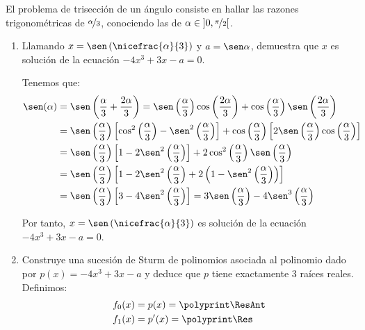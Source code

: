 \begin{ejercicio}
    El problema de trisección de un ángulo consiste en hallar las razones trigonométricas de $\nicefrac{\alpha}{3}$, conociendo las de $\alpha \in \left]0,\nicefrac{\pi}{2}\right[$.
    \begin{enumerate}
        \item Llamando $x = \sen\left(\nicefrac{\alpha}{3}\right)$ y $a = \sen \alpha$, demuestra que $x$ es solución de la ecuación $-4x^3 + 3x - a = 0$.
        
        Tenemos que:
        \begin{align*}
            \sen(\alpha)
            &= \sen\left(\dfrac{\alpha}{3}+\dfrac{2\alpha}{3}\right)=\sen\left(\dfrac{\alpha}{3}\right)\cos\left(\dfrac{2\alpha}{3}\right)+\cos\left(\dfrac{\alpha}{3}\right)\sen\left(\dfrac{2\alpha}{3}\right)\\
            &= \sen\left(\dfrac{\alpha}{3}\right)\left[\cos^2\left(\dfrac{\alpha}{3}\right)-\sen^2\left(\dfrac{\alpha}{3}\right)\right]+\cos\left(\dfrac{\alpha}{3}\right)\left[2\sen\left(\dfrac{\alpha}{3}\right)\cos\left(\dfrac{\alpha}{3}\right)\right]\\
            &= \sen\left(\dfrac{\alpha}{3}\right)\left[1-2\sen^2\left(\dfrac{\alpha}{3}\right)\right]+2\cos^2\left(\dfrac{\alpha}{3}\right)\sen\left(\dfrac{\alpha}{3}\right)\\
            &= \sen\left(\dfrac{\alpha}{3}\right)\left[1-2\sen^2\left(\dfrac{\alpha}{3}\right)+2\left(1-\sen^2\left(\dfrac{\alpha}{3}\right)\right)\right]\\
            &= \sen\left(\dfrac{\alpha}{3}\right)\left[3-4\sen^2\left(\dfrac{\alpha}{3}\right)\right]
            = 3\sen\left(\dfrac{\alpha}{3}\right)-4\sen^3\left(\dfrac{\alpha}{3}\right)
        \end{align*}

        Por tanto, $x=\sen\left(\nicefrac{\alpha}{3}\right)$ es solución de la ecuación $-4x^3 + 3x - a = 0$.

        \item Construye una sucesión de Sturm de polinomios asociada al polinomio dado por $p(x) = -4x^3 + 3x - a$ y deduce que $p$ tiene exactamente 3 raíces reales.\\
        
        Definimos:
        \polymul{}
        \polymul{}
        \begin{align*}
            f_0(x) &= p(x)=\polyprint\ResAnt\\
            f_1(x) &= p'(x)=\polyprint\Res
        \end{align*}


\end{enumerate}
\end{ejercicio}
